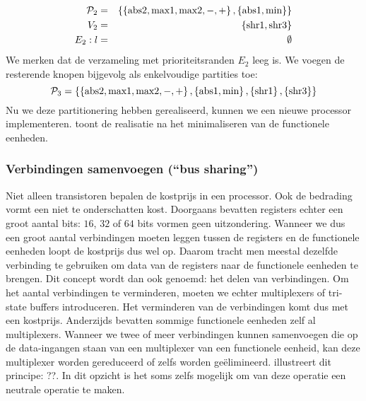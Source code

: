 \begin{eqnarray}
\mathcal{P}_2&=&\left\{ \left\{ \mbox{abs2},\mbox{max1},\mbox{max2},-,+ \right\},\left\{ \mbox{abs1},\mbox{min} \right\} \right\}\\
V_2&=&\left\{ \mbox{shr1},\mbox{shr3} \right\}\\
E_2:l&=&\emptyset
\end{eqnarray}
We merken dat de verzameling met prioriteitsranden $E_2$ leeg is. We voegen de resterende knopen bijgevolg als enkelvoudige partities toe:
\begin{equation}
\mathcal{P}_3=\left\{ \left\{ \mbox{abs2},\mbox{max1},\mbox{max2},-,+ \right\},\left\{ \mbox{abs1},\mbox{min} \right\},\left\{ \mbox{shr1} \right\},\left\{ \mbox{shr3} \right\} \right\}
\end{equation}
Nu we deze partitionering hebben gerealiseerd, kunnen we een nieuwe processor implementeren.  toont de realisatie na het minimaliseren van de functionele eenheden.
\subsubsection{Verbindingen samenvoegen (``bus sharing'')}
Niet alleen transistoren bepalen de kostprijs in een processor. Ook de bedrading vormt een niet te onderschatten kost. Doorgaans bevatten registers echter een groot aantal bits: $16$, $32$ of $64$ bits vormen geen uitzondering. Wanneer we dus een groot aantal verbindingen moeten leggen tussen de registers en de functionele eenheden loopt de kostprijs dus wel op. Daarom tracht men meestal dezelfde verbinding te gebruiken om data van de registers naar de functionele eenheden te brengen. Dit concept wordt dan ook  genoemd: het delen van verbindingen. Om het aantal verbindingen te verminderen, moeten we echter multiplexers of tri-state buffers introduceren. Het verminderen van de verbindingen komt dus met een kostprijs. Anderzijds bevatten sommige functionele eenheden zelf al multiplexers. Wanneer we twee of meer verbindingen kunnen samenvoegen die op de data-ingangen staan van een multiplexer van een functionele eenheid, kan deze multiplexer worden gereduceerd of zelfs worden ge\"elimineerd.
 illustreert dit principe: ??. In dit opzicht is het soms zelfs mogelijk om van deze operatie een neutrale operatie te maken.
